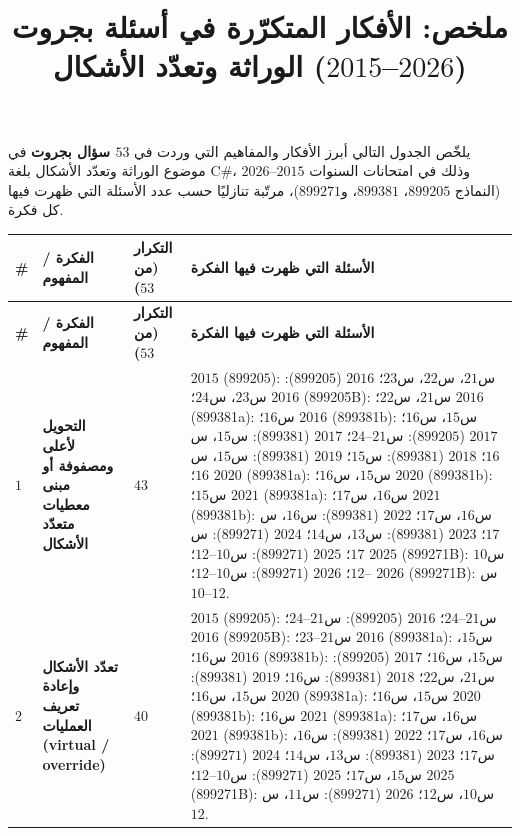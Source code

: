 \documentclass[14pt]{extarticle}
\title{ملخص: الأفكار المتكرّرة في أسئلة بجروت الوراثة وتعدّد الأشكال ($2015$--$2026$)}
\begin{document}
\maketitle
\thispagestyle{fancy}

\begin{boxNote}
يلخّص الجدول التالي أبرز الأفكار والمفاهيم التي وردت في \textbf{$53$ سؤال بجروت} في موضوع الوراثة وتعدّد الأشكال بلغة \textenglish{C\#}، وذلك في امتحانات السنوات $2015$--$2026$ (النماذج $899205$، $899381$، و$899271$)، مرتّبة تنازليًا حسب عدد الأسئلة التي ظهرت فيها كل فكرة.
\end{boxNote}

\vspace{0.5em}

{\renewcommand{\arraystretch}{1.25}
\small
\begin{longtable}{|C{0.05\textwidth}|>{\raggedleft\arraybackslash}p{0.27\textwidth}|C{0.09\textwidth}|>{\raggedleft\arraybackslash}p{0.47\textwidth}|}
\hline
\textbf{\#} & \textbf{الفكرة / المفهوم} & \textbf{التكرار (من $53$)} & \textbf{الأسئلة التي ظهرت فيها الفكرة} \\
\hline
\endfirsthead
\hline
\textbf{\#} & \textbf{الفكرة / المفهوم} & \textbf{التكرار (من $53$)} & \textbf{الأسئلة التي ظهرت فيها الفكرة} \\
\hline
\endhead

$1$ &
\textbf{التحويل لأعلى ومصفوفة أو مبنى معطيات متعدّد الأشكال} &
\textbf{$43$} &
$2015$ ($899205$): س$21$، س$22$، س$23$؛
$2016$ ($899205$): س$23$، س$24$؛
$2016$ (\textenglish{899205B}): س$21$، س$22$؛
$2016$ (\textenglish{899381a}): س$16$؛
$2016$ (\textenglish{899381b}): س$15$، س$16$؛
$2017$ ($899205$): س$21$--$24$؛
$2017$ ($899381$): س$15$، س$16$؛
$2018$ ($899381$): س$15$؛
$2019$ ($899381$): س$15$، س$16$؛
$2020$ (\textenglish{899381a}): س$15$، س$16$؛
$2020$ (\textenglish{899381b}): س$15$؛
$2021$ (\textenglish{899381a}): س$16$، س$17$؛
$2021$ (\textenglish{899381b}): س$16$، س$17$؛
$2022$ ($899381$): س$16$، س$17$؛
$2023$ ($899381$): س$13$، س$14$؛
$2024$ ($899271$): س$17$؛
$2025$ ($899271$): س$10$--$12$؛
$2025$ (\textenglish{899271B}): س$10$--$12$؛
$2026$ ($899271$): س$10$--$12$؛
$2026$ (\textenglish{899271B}): س$10$--$12$. \\
\hline

$2$ &
\textbf{تعدّد الأشكال وإعادة تعريف العمليات (\textenglish{virtual} / \textenglish{override})} &
\textbf{$40$} &
$2015$ ($899205$): س$21$--$24$؛
$2016$ ($899205$): س$21$--$24$؛
$2016$ (\textenglish{899205B}): س$21$--$23$؛
$2016$ (\textenglish{899381a}): س$15$، س$16$؛
$2016$ (\textenglish{899381b}): س$15$، س$16$؛
$2017$ ($899205$): س$21$، س$22$؛
$2018$ ($899381$): س$16$؛
$2019$ ($899381$): س$15$، س$16$؛
$2020$ (\textenglish{899381a}): س$15$، س$16$؛
$2020$ (\textenglish{899381b}): س$16$؛
$2021$ (\textenglish{899381a}): س$16$، س$17$؛
$2021$ (\textenglish{899381b}): س$16$، س$17$؛
$2022$ ($899381$): س$16$، س$17$؛
$2023$ ($899381$): س$13$، س$14$؛
$2024$ ($899271$): س$15$، س$17$؛
$2025$ ($899271$): س$10$--$12$؛
$2025$ (\textenglish{899271B}): س$10$، س$12$؛
$2026$ ($899271$): س$11$، س$12$. \\
\hline


\end{longtable}}
\end{document}
